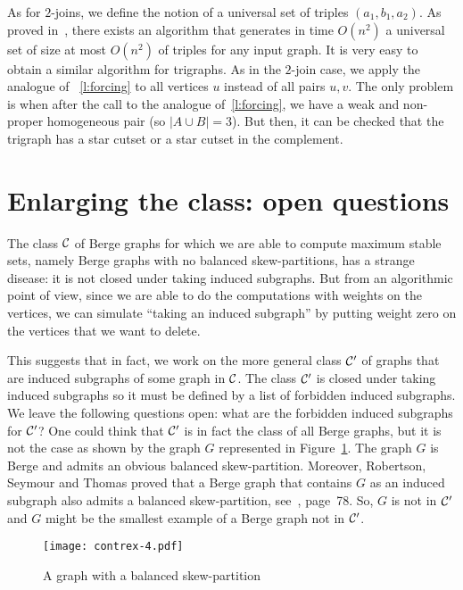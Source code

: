 \documentclass[11 pt] {article}
\newcommand\blackslug{\hbox{\hskip 1pt \vrule width 4pt height 8pt depth 1.5pt
        \hskip 1pt}}
\newcommand\bbox{\hfill \quad \blackslug \medbreak}
\begin{document}
As for $2$-joins, we define the notion of a universal set of triples
$(a_1, b_1, a_2)$.  As proved in~\cite{HaMaMo:HP}, there exists an
algorithm that generates in time $O(n^2)$ a universal set of size at
most $O(n^2)$ of triples for any input graph.  It is very easy to
obtain a similar algorithm for trigraphs.  As in the $2$-join case, we
apply the analogue of ~\ref{l:forcing} to all vertices $u$ instead of
all pairs $u, v$.  The only problem is when after the call to the
analogue of~\ref{l:forcing}, we have a weak and non-proper homogeneous
pair (so $|A \cup B| = 3$).  But then, it can be checked that the
trigraph has a star cutset or a star cutset in the complement.  \bbox


\section{Enlarging the class: open questions}
\label{sec:enlarge}

 The class $\cal C$ of Berge graphs for which we are able to compute maximum
 stable sets, namely Berge graphs with no balanced skew-partitions, has a
 strange disease: it is not closed under taking induced subgraphs.
  But from an algorithmic point of view,
 since we are able to do the computations with weights on the
 vertices, we can simulate ``taking an induced subgraph'' by putting
 weight zero on the vertices that we want to delete.

This suggests that in fact, we work on the more general class ${\cal
  C}'$ of graphs that are  induced subgraphs of some graph in
$\cal C$.  The class ${\cal C}'$ is closed under taking
induced subgraphs so it must be defined by a list of forbidden induced
subgraphs.  We leave the following questions open: what are the
forbidden induced subgraphs for ${\cal C}'$?  One could think that
${\cal C}'$ is in fact the class of all Berge graphs, but it is not
the case as shown by the graph $G$ represented
in Figure~\ref{fig:contrex4}.  The graph $G$ is Berge and admits an obvious
balanced skew-partition.  Moreover,  Robertson, Seymour and Thomas proved
that a Berge graph that contains $G$ as an induced subgraph also
admits a balanced skew-partition, see~\cite{seymour:how}, page~78.
So, $G$ is not in ${\cal C}'$ and $G$ might be the smallest example of
a Berge graph not in ${\cal C}'$.


\begin{figure}
  \begin{center}
    \texttt{[image: contrex-4.pdf]}
    \caption{A graph with a balanced skew-partition\label{fig:contrex4}}
  \end{center}
\end{figure}
\end{document}
